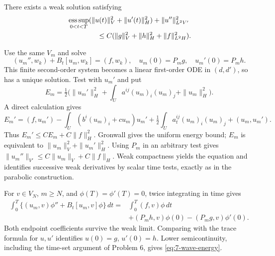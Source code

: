 \Needspace{55mm}
\begin{theorem}
\label{thm:7-wave-existence}
There exists a weak solution satisfying
\begin{equation}\label{eq:7-wave-energy}
 \begin{split}
 &\mathop{\rm ess\,sup}_{0<t<T}
 (\|u(t)\|_V^2+\|u'(t)\|_H^2)+\|u''\|_{L^2V'}^2\\
 &\hspace{15mm}\leq C(\|g\|_V^2+\|h\|_H^2+\|f\|_{L^2H}^2).
 \end{split}
\end{equation}
\end{theorem}
\begin{expandedproof}
Use the same $V_m$ and solve
\[
 (u_m'',w_k)+B_t[u_m,w_k]=(f,w_k),\quad
 u_m(0)=P_mg,\quad u_m'(0)=P_mh.
\]
This finite second-order system becomes a linear first-order ODE in
$(d,d')$, so has a unique solution. Test with $u_m'$ and put
\[
 E_m=\tfrac12\big(\|u_m'\|_H^2+
          \int_Ua^{ij}(u_m)_i(u_m)_j+\|u_m\|_H^2\big).
\]
A direct calculation gives
\[
 E_m'=(f,u_m')-\int_U(b^i(u_m)_i+cu_m)u_m'
      +\tfrac12\int_Ua_t^{ij}(u_m)_i(u_m)_j+(u_m,u_m').
\]
Thus $E_m'\leq CE_m+C\|f\|_H^2$. Gronwall gives the uniform energy
bound; $E_m$ is equivalent to $\|u_m\|_V^2+\|u_m'\|_H^2$.
Using $P_m$ in an arbitrary test gives
$\|u_m''\|_{V'}\leq C\|u_m\|_V+C\|f\|_H$.
Weak compactness yields the equation and identifies successive weak
derivatives by scalar time tests, exactly as in the parabolic construction.

For $v\in V_N$, $m\geq N$, and $\phi(T)=\phi'(T)=0$, twice integrating
in time gives
\[
 \begin{split}
 \int_0^T\{(u_m,v)\phi''+B_t[u_m,v]\phi\}\,dt
 ={}&\int_0^T(f,v)\phi\,dt\\
 &+(P_mh,v)\phi(0)-(P_mg,v)\phi'(0).
 \end{split}
\]
Both endpoint coefficients survive the weak limit. Comparing with the
trace formula for $u,u'$ identifies $u(0)=g$, $u'(0)=h$. Lower
semicontinuity, including the time-set argument of Problem 6, gives
\eqref{eq:7-wave-energy}.
\end{expandedproof}

\Needspace{55mm}
